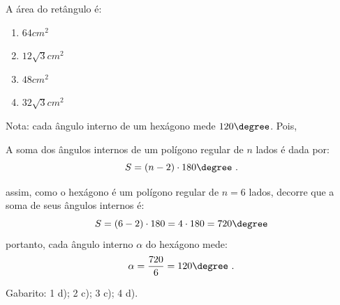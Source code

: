 \begin{enumerate}
  
  A área do retângulo é:
  \begin{enumerate}
  \item $64cm^2$
  \item $12\sqrt{3}cm^2$
  \item $48cm^2$
  \item $32\sqrt{3}cm^2$
 \end{enumerate}
 
 {\color{red} Nota:} cada ângulo interno de um hexágono mede $120\degree$.
 Pois, 
 \vskip0.3cm
\colorbox{azul}{
 \begin{minipage}{14.5cm}
 \begin{center}
 A soma dos ângulos internos de um polígono regular de $n$ lados é dada por:
  \[S= (n-2)\cdot 180 \degree \ .\]
 \end{center}
 \end{minipage}}
 \vskip0.3cm
 assim, como o hexágono é um polígono regular de $n= 6$ lados, decorre que a soma de seus ângulos internos é:
 \[S= (6-2)\cdot 180= 4 \cdot 180= 720 \degree\]
 portanto, cada ângulo interno $\alpha$ do hexágono mede:
 \[\alpha= \frac{720}{6}= 120 \degree \ .\]

 
 \end{enumerate}
 
 Gabarito: 1 d); 2 c); 3 c); 4 d).
